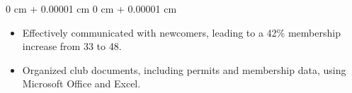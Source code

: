 \documentclass[10pt, letterpaper]{article}
\newenvironment{highlights}{
    \begin{itemize}[
        topsep=0.10 cm,
        parsep=0.10 cm,
        partopsep=0pt,
        itemsep=0pt,
        leftmargin=0 cm + 10pt
    ]
}{
    \end{itemize}
} %
\newenvironment{onecolentry}{
    \begin{adjustwidth}{
        0 cm + 0.00001 cm
    }{
        0 cm + 0.00001 cm
    }
}{
    \end{adjustwidth}
} %
\begin{document}
        \vspace{0.10 cm}
        \begin{onecolentry}
            \begin{highlights}
                \item Effectively communicated with newcomers, leading to a 42\% membership increase from 33 to 48.
                \item Organized club documents, including permits and membership data, using Microsoft Office and Excel.
            \end{highlights}
        \end{onecolentry}



    
\end{document}
